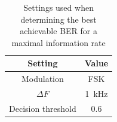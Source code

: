 \documentclass[11pt,titlepage]{report}
\begin{document}
\begin{appendices}
\begin{table}[H]
	\centering
	\caption{Settings used when determining the best achievable BER for a maximal information rate}
	\label{tab:app-ber}
	\begin{tabular}{c c}
		\hline\hline
		Setting & Value \\
		\hline
		Modulation & FSK \\
		$\Delta F$ & \SI{1}{kHz} \\
		Decision threshold & \num{0.6} \\
		\hline
	\end{tabular}
\end{table}

\end{appendices}
\end{document}
